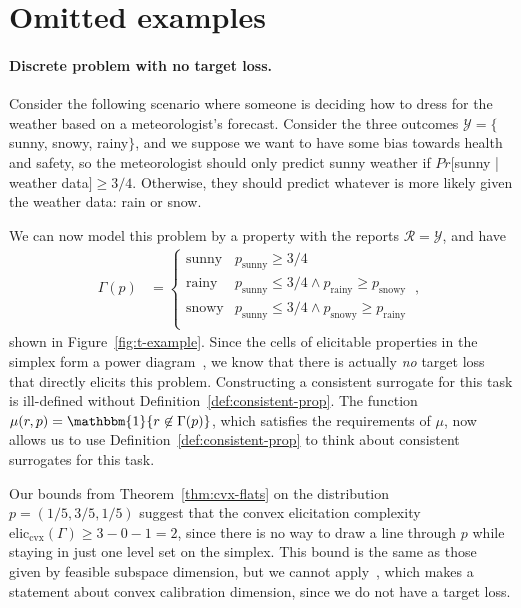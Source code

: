 \documentclass{article}
\newcommand{\eliccvx}{\mathrm{elic}_\mathrm{cvx}}
\newcommand{\propdis}{\mu}
\newcommand{\R}{\mathcal{R}}
\newcommand{\Y}{\mathcal{Y}}
\newcommand{\ones}{\mathbbm{1}}
\begin{document}
\section{Omitted examples}
\paragraph{Discrete problem with no target loss.}
Consider the following scenario where someone is deciding how to dress for the weather based on a meteorologist's forecast.
Consider the three outcomes $\Y = \{$sunny, snowy, rainy$\}$, and we suppose we want to have some bias towards health and safety, so the meteorologist should only predict sunny weather if $Pr[$sunny | weather data$] \geq 3/4$.
Otherwise, they should predict whatever is more likely  given the weather data: rain or snow.

We can now model this problem by a property with the reports $\R = \Y$, and have 
\begin{align*}
\Gamma(p) &= \begin{cases}
\text{sunny} & p_{\text{sunny}} \geq 3/4 \\
\text{rainy} & p_{\text{sunny}} \leq 3/4 \wedge p_{\text{rainy}} \geq p_{\text{snowy}} \\
\text{snowy} & p_{\text{sunny}} \leq 3/4 \wedge p_{\text{snowy}} \geq p_{\text{rainy}} \\
\end{cases}~,~
\end{align*} 
shown in Figure~\ref{fig:t-example}.
Since the cells of elicitable properties in the simplex form a power diagram~\citep{lambert2009eliciting}, we know that there is actually \emph{no} target loss that directly elicits this problem.
Constructing a consistent surrogate for this task is ill-defined without Definition~\ref{def:consistent-prop}.
The function $\propdis(r,p) = \ones\{r \not \in \Gamma(p)\}$, which satisfies the requirements of $\propdis$, now allows us to use Definition~\ref{def:consistent-prop} to think about consistent surrogates for this task.

Our bounds from Theorem~\ref{thm:cvx-flats} on the distribution $p = (1/5, 3/5, 1/5)$ suggest that the convex elicitation complexity $\eliccvx(\Gamma) \geq 3 - 0 -1 = 2$, since there is no way to draw a line through $p$ while staying in just one level set on the simplex.
This bound is the same as those given by feasible subspace dimension, but we cannot apply~\citet[Theorem 16]{ramaswamy2016convex}, which makes a statement about convex calibration dimension, since we do not have a target loss.
\end{document}
